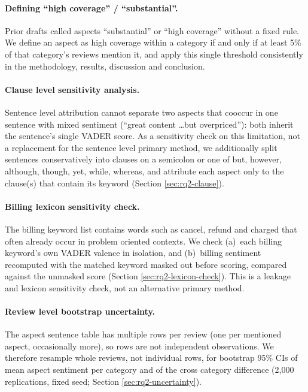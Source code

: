 \documentclass[11pt,a4paper,DIV=12]{scrartcl}
\begin{document}
\paragraph{Defining ``high coverage'' / ``substantial''.}
\label{sec:method-coverage}
Prior drafts called aspects ``substantial'' or ``high coverage'' without a
fixed rule. We define an aspect as high coverage within a category if and only if
at least 5\% of that category's reviews mention it, and apply this single
threshold consistently in the methodology, results, discussion and conclusion.

\paragraph{Clause level sensitivity analysis.}
Sentence level attribution cannot separate two aspects that cooccur in one
sentence with mixed sentiment (``great content \dots but overpriced''): both
inherit the sentence's single VADER score. As a sensitivity check on this
limitation, not a replacement for the sentence level primary method, we
additionally split sentences conservatively into clauses on a semicolon or one
of but, however, although, though, yet, while, whereas, and attribute
each aspect only to the clause(s) that contain its keyword (Section
\ref{sec:rq2-clause}).

\paragraph{Billing lexicon sensitivity check.}
The billing keyword list contains words such as cancel, refund
and charged that often already occur in problem oriented contexts. We
check (a)~each billing keyword's own VADER valence in isolation, and (b)~billing
sentiment recomputed with the matched keyword masked out before scoring,
compared against the unmasked score (Section \ref{sec:rq2-lexicon-check}). This
is a leakage and lexicon sensitivity check, not an alternative primary method.

\paragraph{Review level bootstrap uncertainty.}
The aspect sentence table has multiple rows per review (one per mentioned
aspect, occasionally more), so rows are not independent observations. We
therefore resample whole reviews, not individual rows, for bootstrap 95\%
CIs of mean aspect sentiment per category and of the cross category difference
(2,000 replications, fixed seed; Section \ref{sec:rq2-uncertainty}).
\end{document}
